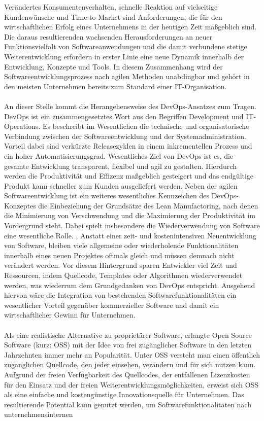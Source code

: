 Verändertes Konsumentenverhalten, schnelle Reaktion auf vielseitige Kundenwünsche und Time-to-Market sind Anforderungen, die für den wirtschaftlichen Erfolg eines Unternehmens in der heutigen Zeit maßgeblich sind. Die daraus resultierenden wachsenden Herausforderungen an neuer Funktionsvielfalt von Softwareanwendungen und die damit verbundene stetige Weiterentwicklung erfordern in erster Linie eine neue Dynamik innerhalb der Entwicklung, Konzepte und Tools. In diesem Zusammenhang wird der Softwareentwicklungsprozess nach agilen Methoden unabdingbar und gehört in den meisten Unternehmen bereits zum Standard einer IT-Organisation. \\\\ An dieser Stelle kommt die Herangehensweise des DevOps-Ansatzes zum Tragen. DevOps ist ein zusammengesetztes Wort aus den Begriffen Development und IT-Operations. Es beschreibt im Wesentlichen die technische und organisatorische Verbindung zwischen der Softwareentwicklung und der Systemadministration. \cite[S.23]{alt_innovationsorientiertes_2017} Vorteil dabei sind verkürzte Releasezyklen in einem inkrementellen Prozess und ein hoher Automatisierungsgrad. Wesentliches Ziel von DevOps ist es, die gesamte Entwicklung transparent, flexibel und agil zu gestalten. Hierdurch werden die Produktivität und Effizenz maßgeblich gesteigert und das endgültige Produkt kann schneller zum Kunden ausgeliefert werden. \cite{hemon_agile_2020} Neben der agilen Softwareentwicklung ist ein weiteres wesentliches Kennzeichen des DevOps-Konzeptes die Einbeziehung der Grundsätze des Lean Manufactoring, nach denen die Minimierung von Verschwendung und die Maximierung der Produktivität im Vordergrund steht. \cite{samulat_raus_2017} Dabei spielt insbesondere die Wiederverwendung von Software eine wesentliche Rolle. \cite[S. 140 - 141]{poppendieck_lean_2010}, \cite[S. 38]{ravichandran_devops_2016} Anstatt einer zeit- und kostenintensiven Neuentwicklung von Software, bleiben viele allgemeine oder wiederholende Funktionalitäten innerhalb eines neuen Projektes oftmals gleich und müssen demnach nicht verändert werden. Vor diesem Hintergrund sparen Entwickler viel Zeit und Ressourcen, indem Quellcode, Templates oder Algorithmen wiederverwendet werden, was wiederrum dem Grundgedanken von DevOps entspricht. Ausgehend hiervon wäre die Integration von bestehenden Softwarefunktionalitäten ein wesentlicher Vorteil gegenüber kommerzieller Software und damit ein wirtschaftlicher Gewinn für Unternehmen. \\\\ Als eine realistische Alternative zu proprietärer Software, erlangte Open Source Software (kurz: OSS) mit der Idee von frei zugänglicher Software in den letzten Jahrzehnten immer mehr an Popularität.\cite[S. 21,22]{allmann_open_2019} Unter OSS versteht man einen öffentlich zugänglichen Quellcode, den jeder einsehen, verändern und für sich nutzen kann. Aufgrund der freien Verfügbarkeit des Quellcodes, der entfallenen Lizenzkosten für den Einsatz und der freien Weiterentwicklungsmöglichkeiten, erweist sich OSS als eine einfache und kostengünstige Innovationsquelle für Unternehmen. Das resultierende Potential kann genutzt werden, um Softwarefunktionalitäten nach unternehmensinternen 